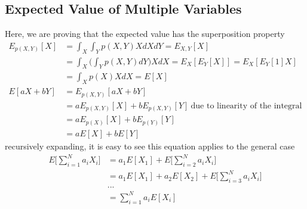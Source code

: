 \documentclass{article}
\numberwithin{equation}{subsection}
\begin{document}
\subsection{Expected Value of Multiple Variables}
\label{multi_mean_derivation}
Here, we are proving that the expected value has the superposition property
\begin{align}
     E_{p(X,Y)}[X] 
     &= \int_X\int_Y p(X,Y)X dX dY = E_{X,Y}[X]\\
     &= \int_X\Big(\int_Y p(X,Y)dY\Big) X dX = E_{X}[E_{Y}[X]] = E_{X}[E_{Y}[1]X]\\
     &= \int_X p(X) X dX = E[X]\\
    E[aX+bY] 
    &= E_{p(X,Y)}[aX+bY]\\
    &= aE_{p(X,Y)}[X]+bE_{p(X,Y)}[Y]\ \text{due to linearity of the integral}\\
    &= aE_{p(X)}[X]+bE_{p(Y)}[Y]\\
    &= aE[X]+bE[Y]
\end{align}
recursively expanding, it is easy to see this equation applies to the general case
\begin{align}
    E\big[\sum_{i=1}^N a_iX_i\big] &= a_1E[X_1]+E\big[\sum_{i=2}^N a_iX_i\big]\\
    &= a_1E[X_1]+a_2E[X_2]+E\big[\sum_{i=3}^N a_iX_i\big]\\
    & ...\\
    &= \sum_{i=1}^N a_iE[X_i]~\label{mean_superpos}
\end{align}
\end{document}
